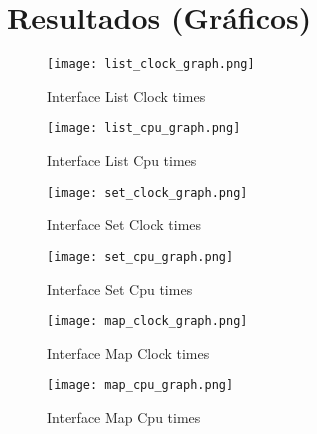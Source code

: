 \newpage
\section{Resultados (Gráficos)}\label{sec:graphics}
	\begin{figure}[!ht]
		\centering
		\texttt{[image: list\_clock\_graph.png]}
		\caption{Interface List Clock times}
		\label{fig:list_clock}
	\end{figure}

	\begin{figure}[!ht]
		\centering
		\texttt{[image: list\_cpu\_graph.png]}
		\caption{Interface List Cpu times}
		\label{fig:list_cpu}
	\end{figure}

  \newpage
	\begin{figure}[!ht]
		\centering
		\texttt{[image: set\_clock\_graph.png]}
		\caption{Interface Set Clock times}
		\label{fig:set_clock}
	\end{figure}

	\begin{figure}[!ht]
		\centering
		\texttt{[image: set\_cpu\_graph.png]}
		\caption{Interface Set Cpu times}
		\label{fig:set_cpu}
	\end{figure}
  
  \newpage
	\begin{figure}[!ht]
		\centering
		\texttt{[image: map\_clock\_graph.png]}
		\caption{Interface Map Clock times}
		\label{fig:map_clock}
	\end{figure}

	\begin{figure}[!ht]
		\centering
		\texttt{[image: map\_cpu\_graph.png]}
		\caption{Interface Map Cpu times}
		\label{fig:map_cpu}
	\end{figure}

